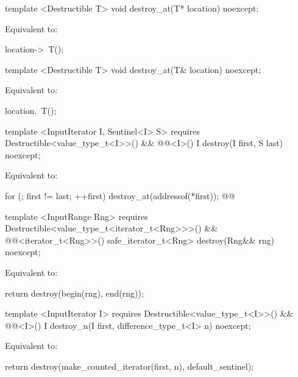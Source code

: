 {\color{addclr}
\begin{codeblock}
template <Destructible T>
  void destroy_at(T* location) noexcept;
\end{codeblock}
} %

\setcounter{Paras}{0}
\pnum
\effects Equivalent to:
\begin{codeblock}
        location->~T();
\end{codeblock}

{\color{addclr}
\begin{codeblock}
template <Destructible T>
  void destroy_at(T& location) noexcept;
\end{codeblock}

\pnum
\effects Equivalent to:
\begin{codeblock}
        location.~T();
\end{codeblock}

\begin{codeblock}
template <InputIterator I, Sentinel<I> S>
  requires Destructible<value_type_t<I>>() &&
           @@<I>()
    I destroy(I first, S last) noexcept;
\end{codeblock}
}

\pnum
\effects Equivalent to:
\begin{codeblock}
        for (; first != last; ++first)
          destroy_at(addressof(*first));
        @@
\end{codeblock}

{\color{addclr}
\begin{codeblock}
template <InputRange Rng>
  requires Destructible<value_type_t<iterator_t<Rng>>>() &&
           @@<iterator_t<Rng>>()
    safe_iterator_t<Rng> destroy(Rng&& rng) noexcept;
\end{codeblock}

\pnum
\effects Equivalent to:
\begin{codeblock}
        return destroy(begin(rng), end(rng));
\end{codeblock}

\begin{codeblock}
template <InputIterator I>
  requires Destructible<value_type_t<I>>() &&
           @@<I>()
    I destroy_n(I first, difference_type_t<I> n) noexcept;
\end{codeblock}

\pnum
\effects Equivalent to:
\begin{codeblock}
        return destroy(make_counted_iterator(first, n), default_sentinel{});
\end{codeblock}
} %
